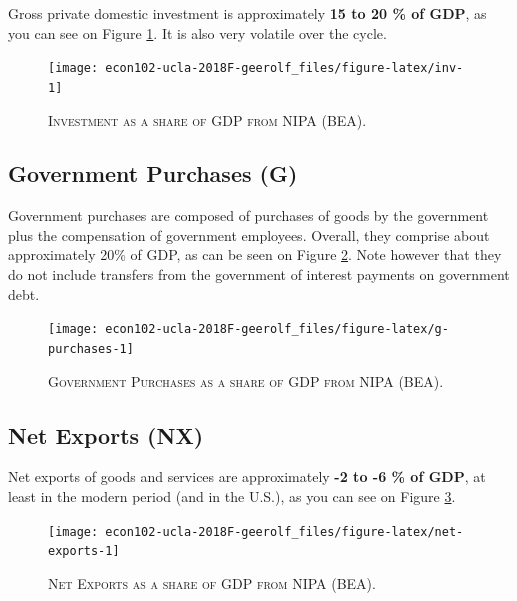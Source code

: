 \documentclass[]{book}
\begin{document}
Gross private domestic investment is approximately \textbf{15 to 20 \%
of GDP}, as you can see on Figure \ref{fig:inv}. It is also very
volatile over the cycle.



\begin{figure}

{\centering \texttt{[image: econ102-ucla-2018F-geerolf\_files/figure-latex/inv-1]} 

}

\caption{\textsc{Investment as a share of GDP from NIPA (BEA)}.}\label{fig:inv}
\end{figure}

\subsection{Government Purchases (G)}\label{gov}

Government purchases are composed of purchases of goods by the
government plus the compensation of government employees. Overall, they
comprise about approximately 20\% of GDP, as can be seen on Figure
\ref{fig:g-purchases}. Note however that they do not include transfers
from the government of interest payments on government debt.




\begin{figure}

{\centering \texttt{[image: econ102-ucla-2018F-geerolf\_files/figure-latex/g-purchases-1]} 

}

\caption{\textsc{Government Purchases as a share of GDP
from NIPA (BEA)}.}\label{fig:g-purchases}
\end{figure}

\subsection{Net Exports (NX)}\label{net-exports}

Net exports of goods and services are approximately \textbf{-2 to -6 \%
of GDP}, at least in the modern period (and in the U.S.), as you can see
on Figure \ref{fig:net-exports}.




\begin{figure}

{\centering \texttt{[image: econ102-ucla-2018F-geerolf\_files/figure-latex/net-exports-1]} 

}

\caption{\textsc{Net Exports as a share of GDP from NIPA
(BEA)}.}\label{fig:net-exports}
\end{figure}
\end{document}
